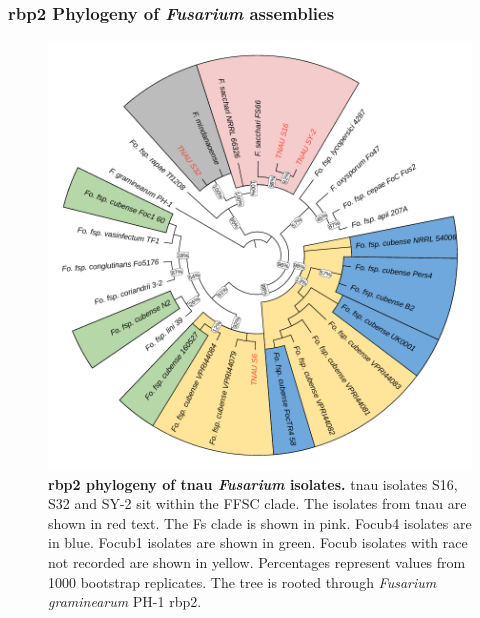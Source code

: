 \newpage
\subsubsection{\acf{rbp2} Phylogeny of \textit{Fusarium} assemblies}
\begin{figure}[htp!]
    \centering
    \includegraphics[width=14cm]{Appendices/RPNii-Phylogeny.pdf}
    \caption[\Acl{rbp2} phylogeny of \acl{tnau} \textit{Fusarium} isolates.]{\textbf{\Acl{rbp2} phylogeny of \acl{tnau} \textit{Fusarium} isolates.} \Ac{tnau} isolates S16, S32 and SY-2 sit within the \acf{FFSC} clade. The isolates from \ac{tnau} are shown in red text. The \acf{Fs} clade is shown in pink. \Acf{Focub4} isolates are in blue. \Acf{Focub1} isolates are shown in green. \acf{Focub} isolates with race not recorded are shown in yellow. Percentages represent values from 1000 bootstrap replicates. The tree is rooted through \textit{Fusarium graminearum} PH-1 \ac{rbp2}.}
    \label{fig:rbp2Phylo}
\end{figure}

\newpage
